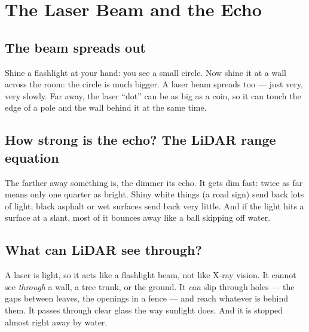 \chapter{The Laser Beam and the Echo}

\section{The beam spreads out}

\begin{kid}
Shine a flashlight at your hand: you see a small circle. Now shine it at a wall across the room: the circle is much bigger. A laser beam spreads too --- just very, very slowly. Far away, the laser ``dot'' can be as big as a coin, so it can touch the edge of a pole and the wall behind it at the same time.
\end{kid}


\section{How strong is the echo? The LiDAR range equation}

\begin{kid}
The farther away something is, the dimmer its echo. It gets dim fast: twice as far means only one quarter as bright. Shiny white things (a road sign) send back lots of light; black asphalt or wet surfaces send back very little. And if the light hits a surface at a slant, most of it bounces away like a ball skipping off water.
\end{kid}


\section{What can LiDAR see through?}

\begin{kid}
A laser is light, so it acts like a flashlight beam, not like X-ray vision. It cannot see \emph{through} a wall, a tree trunk, or the ground. It \emph{can} slip through holes --- the gaps between leaves, the openings in a fence --- and reach whatever is behind them. It passes through clear glass the way sunlight does. And it is stopped almost right away by water.
\end{kid}

